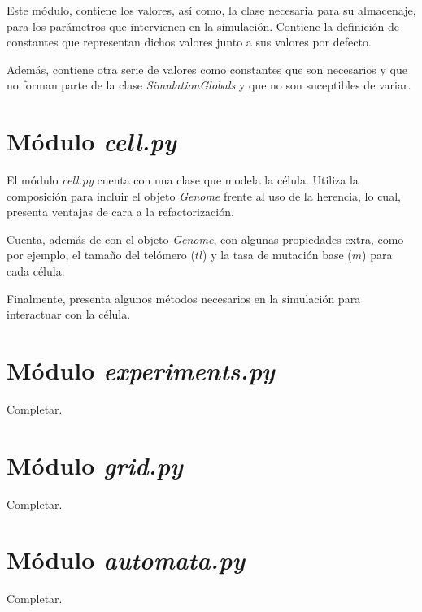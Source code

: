 Este módulo, contiene los valores, así como, la clase necesaria para su almacenaje, para
los parámetros que intervienen en la simulación. Contiene la definición de constantes que
representan dichos valores junto a sus valores por defecto.

Además, contiene otra serie de valores como constantes que son necesarios y que no forman parte de la
clase \textit{SimulationGlobals} y que no son suceptibles de variar.

\section{Módulo \textit{cell.py}}

El módulo \textit{cell.py} cuenta con una clase que modela la célula. Utiliza la composición
para incluir el objeto \textit{Genome} frente al uso de la herencia, lo cual, presenta ventajas
de cara a la refactorización.

Cuenta, además de con el objeto \textit{Genome}, con algunas propiedades extra, como por ejemplo,
el tamaño del telómero ($tl$) y la tasa de mutación base ($m$) para cada célula.

Finalmente, presenta algunos métodos necesarios en la simulación para interactuar con la célula.

\section{Módulo \textit{experiments.py}}

Completar.

\section{Módulo \textit{grid.py}}

Completar.

\section{Módulo \textit{automata.py}}

Completar.
